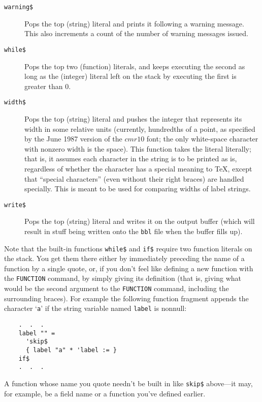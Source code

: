 \begin{description}
\item[\hbox{\tt warning\$}\hfill]
Pops the top (string) literal
and prints it following a warning message.
This also increments a count of the number of warning messages issued.

\item[\hbox{\tt while\$}\hfill]
Pops the top two (function) literals,
and keeps executing the second as long as the (integer)
literal left on the stack by executing the first is greater than 0.

\item[\hbox{\tt width\$}\hfill]
Pops the top (string) literal
and pushes the integer that represents its width in some relative units
(currently, hundredths of a point, as specified by the June 1987 version
of the $cmr10$ font; the only white-space character with nonzero width
is the space).
This function takes the literal literally;
that is, it assumes each character in the string is to be printed as
is, regardless of whether the character has a special meaning to \TeX,
except that ``special characters'' (even without their right braces) are
handled specially.
This is meant to be used for comparing widths of label strings.

\item[\hbox{\tt write\$}\hfill]
Pops the top (string) literal
and writes it on the output buffer (which will result in
stuff being written onto the {\tt bbl} file when the buffer fills up).

\end{description}

Note that the built-in functions \hbox{\tt while\$} and \hbox{\tt if\$}
require two function literals on the stack.
You get them there either by immediately preceding the name of a function
by a single quote, or, if you don't feel like defining a new function with
the \hbox{\tt FUNCTION} command,
by simply giving its definition (that is, giving what would be the second
argument to the \hbox{\tt FUNCTION} command, including the surrounding braces).
For example the following function fragment appends the character `{\tt a}'
if the string variable named \hbox{\tt label} is nonnull:
\begin{verbatim}
    .  .  .
    label "" =
      'skip$
      { label "a" * 'label := }
    if$
    .  .  .
\end{verbatim}
A function whose name you quote needn't be built in
like \hbox{\tt skip\$} above---it may, for example,
be a field name or a function you've defined earlier.


